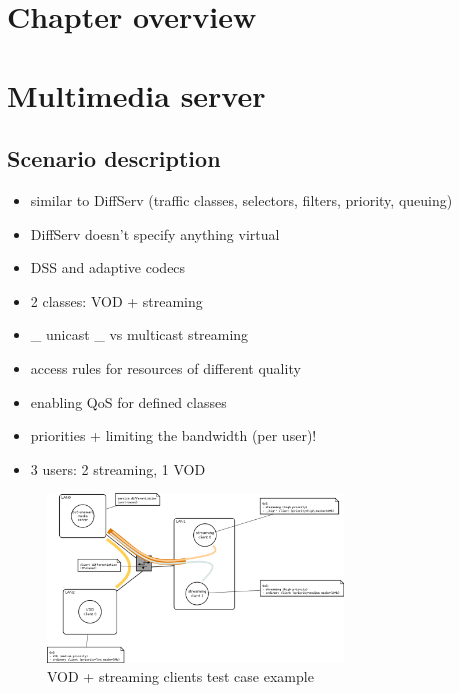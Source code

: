 \documentclass[11pt]{book}
\begin{document}
    \section*{Chapter overview}


    \section{Multimedia server}

      \subsection{Scenario description}

        \begin{itemize}
          \item similar to DiffServ (traffic classes, selectors, filters, priority, queuing)
          \item DiffServ doesn't specify anything virtual
          \item DSS and adaptive codecs
        \end{itemize}

        \begin{itemize}
          \item 2 classes: VOD + streaming
          \item \_ unicast \_ vs multicast streaming
          \item access rules for resources of different quality
          \item enabling QoS for defined classes
          \item priorities + limiting the bandwidth (per user)!
          \item 3 users: 2 streaming, 1 VOD
        \end{itemize}

        \begin{figure}[H]
                   \begin{center}
                         \includegraphics[width=0.7\textwidth]{img/test-case/diagram.png}
                         \caption{VOD + streaming clients test case example}
                   \end{center}
        \end{figure}
\end{document}
